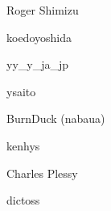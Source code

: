 \begin{prework}{ Roger Shimizu }
\end{prework}

\begin{prework}{ koedoyoshida }
\end{prework}

\begin{prework}{ yy\_y\_ja\_jp }
\end{prework}

\begin{prework}{ ysaito }
\end{prework}

\begin{prework}{ BurnDuck (nabaua) }
\end{prework}

\begin{prework}{ kenhys }
\end{prework}

\begin{prework}{ Charles Plessy }
\end{prework}

\begin{prework}{ dictoss }
\end{prework}

